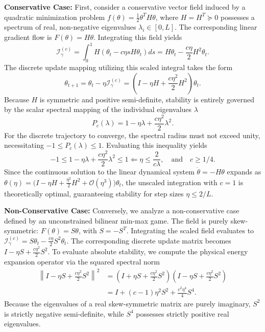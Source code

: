 \documentclass[letter,11pt]{article}
\begin{document}
\noindent\textbf{Conservative Case:} First, consider a conservative vector field induced by a quadratic minimization problem $f(\theta) = \frac{1}{2} \theta^T H \theta$, where $H = H^T \succeq 0$ possesses a spectrum of real, non-negative eigenvalues $\lambda_i \in [0, L]$. The corresponding linear gradient flow is $F(\theta) = H\theta$. Integrating this field yields
\begin{equation}
\mathcal{I}_{\gamma}^{(c)} = \int_0^1 H(\theta_t - c\eta s H \theta_t) ds = H\theta_t - \frac{c\eta}{2}H^2\theta_t.
\end{equation}
The discrete update mapping utilizing this scaled integral takes the form
\begin{equation}
\theta_{t+1} = \theta_t - \eta \mathcal{I}_{\gamma}^{(c)} = \left( I - \eta H + \frac{c\eta^2}{2}H^2 \right) \theta_t.
\end{equation}
Because $H$ is symmetric and positive semi-definite, stability is entirely governed by the scalar spectral mapping of the individual eigenvalues $\lambda$
\begin{equation}
P_c(\lambda) = 1 - \eta \lambda + \frac{c\eta^2}{2}\lambda^2.
\end{equation}
For the discrete trajectory to converge, the spectral radius must not exceed unity, necessitating $-1\le P_c(\lambda) \le 1$. Evaluating this inequality yields
\begin{equation}
-1 \le 1 - \eta \lambda + \frac{c\eta^2}{2}\lambda^2 \le 1 \Longleftarrow \eta \le \frac{2}{c\lambda}, \quad \text{and} \quad c \ge 1/4.
\end{equation}
Since the continuous solution to the linear dynamical system $\dot{\theta} = -H\theta$ expands as $\theta(\eta) = \big(I - \eta H + \frac{\eta^2}{2}H^2 + \mathcal{O}(\eta^3)\big)\theta_t$, the unscaled integration with $c=1$ is theoretically optimal, guaranteeing stability for step sizes $\eta \le 2/L$. 

\noindent\textbf{Non-Conservative Case:} Conversely, we analyze a non-conservative case defined by an unconstrained bilinear min-max game. The field is purely skew-symmetric: $F(\theta) = S\theta$, with $S = -S^T$. Integrating the scaled field evaluates to $\mathcal{I}_{\gamma}^{(c)} = S\theta_t - \frac{c\eta}{2} S^2 \theta_t$. The corresponding discrete update matrix becomes $I - \eta S + \frac{c\eta^2}{2} S^2$. To evaluate absolute stability, we compute the physical energy expansion operator via the squared spectral norm
\begin{equation}
\begin{aligned}
\left\| I - \eta S + \frac{c\eta^2}{2} S^2 \right\|^2 &= \left( I + \eta S + \frac{c\eta^2}{2} S^2 \right)\left( I - \eta S + \frac{c\eta^2}{2} S^2 \right) \\
&= I + (c - 1)\eta^2 S^2 + \frac{c^2\eta^4}{4} S^4.
\end{aligned}
\end{equation}
Because the eigenvalues of a real skew-symmetric matrix are purely imaginary, $S^2$ is strictly negative semi-definite, while $S^4$ possesses strictly positive real eigenvalues. 
\end{document}
